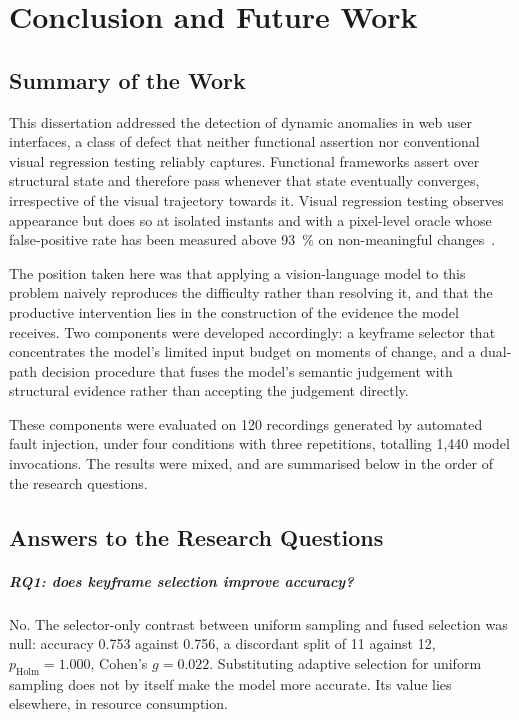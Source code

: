 %

\chapter{Conclusion and Future Work}
\label{chap:conclusion}


\section{Summary of the Work}
\label{sec:conclusion-summary}

This dissertation addressed the detection of dynamic anomalies in web user
interfaces, a class of defect that neither functional assertion nor
conventional visual regression testing reliably captures. Functional
frameworks assert over structural state and therefore pass whenever that
state eventually converges, irrespective of the visual trajectory towards
it. Visual regression testing observes appearance but does so at isolated
instants and with a pixel-level oracle whose false-positive rate has been
measured above \SI{93}{\percent} on non-meaningful
changes~\citep{zhang2026beyond}.

The position taken here was that applying a vision-language model to this
problem naively reproduces the difficulty rather than resolving it, and
that the productive intervention lies in the construction of the evidence
the model receives. Two components were developed accordingly: a keyframe
selector that concentrates the model's limited input budget on moments of
change, and a dual-path decision procedure that fuses the model's semantic
judgement with structural evidence rather than accepting the judgement
directly.

These components were evaluated on 120 recordings generated by automated
fault injection, under four conditions with three repetitions, totalling
1{,}440 model invocations. The results were mixed, and are summarised
below in the order of the research questions.


\section{Answers to the Research Questions}
\label{sec:answers}

\paragraph{RQ1: does keyframe selection improve accuracy?}
No. The selector-only contrast between uniform sampling and fused
selection was null: accuracy 0.753 against 0.756, a discordant split of 11
against 12, $p_{\text{Holm}} = 1.000$, Cohen's $g = 0.022$. Substituting
adaptive selection for uniform sampling does not by itself make the model
more accurate. Its value lies elsewhere, in resource consumption.

